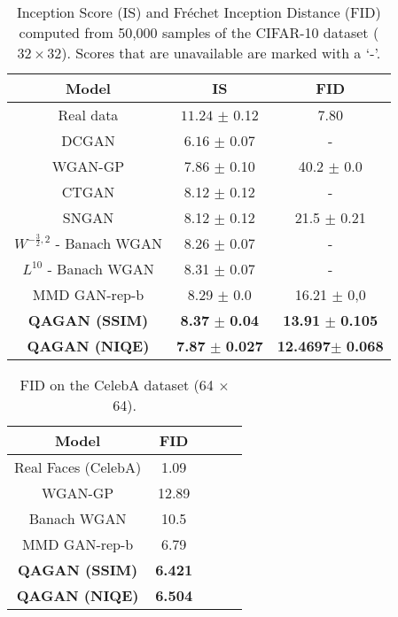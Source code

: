 \documentclass{article}
\begin{document}
\begin{table}[htbp]            
\centering
\caption{Inception Score (IS) and Fr\'echet Inception Distance (FID) computed from 50,000 samples of the CIFAR-10 dataset ($32\times 32$). Scores that are unavailable are marked with a `-'.}
  \begin{tabular}{|c|c|c|}
    \hline
      {\bf{Model}} &
      {\bf{IS}} & {\bf{FID}}\\
      \hline
    Real data & $ 11.24$ $\pm$ 0.12 & 7.80 \\
      \hline
    DCGAN \cite{radford2015unsupervised} & $ 6.16$ $\pm$ 0.07 & -  \\
    \hline
     WGAN-GP \cite{gulrajani2017improved}  & $ 7.86$ $\pm$ 0.10  & 40.2 $\pm$ 0.0 \\
     \hline
     CTGAN \cite{kim2018ct}  &  8.12 $\pm$ 0.12 & -  \\
      \hline
     SNGAN \cite{miyato2018spectral}  &  8.12 $\pm$ 0.12 & 21.5 $\pm$ 0.21  \\
     \hline
    $ W^{-\frac{3}{2},2}$ - Banach WGAN \cite{adler2018banach} & 8.26 $\pm$ 0.07 & - \\
    \hline
     $ L^{10}$ - Banach WGAN \cite{adler2018banach} & 8.31 $\pm $ 0.07 & - \\
   \hline
     MMD GAN-rep-b \cite{li2017mmd} & 8.29 $\pm$ 0.0 & 16.21 $\pm$ 0,0\\
    \hline
     \textbf{QAGAN (SSIM)} & \textbf{8.37} $\pm$ \textbf{0.04} & \textbf{13.91} $\pm$ \textbf{0.105}\\
    \hline
    \textbf{QAGAN (NIQE)} & \textbf{7.87} $\pm$ \textbf{0.027}   & \textbf{12.4697}$\pm $ \textbf{0.068}\\
\hline
    \end{tabular}
    \label{tab:cifar}
\end{table}
\begin{table}[htbp] 
\begin{center}
 \caption{FID on the CelebA dataset (64 $\times$ 64).}
 \label{tab:celeba}
\begin{tabular}{|c|c|c|c|c|}
    \hline
      {\bf{Model}} & {\bf{FID}} \\
      \hline
     Real Faces (CelebA) &  1.09 \\
    \hline
     WGAN-GP \cite{gulrajani2017improved}  & 12.89 \\
     \hline
      Banach WGAN \cite{adler2018banach} & 10.5 \\\hline
   MMD GAN-rep-b \cite{li2017mmd} & 6.79 \\\hline
     \textbf{QAGAN (SSIM)} &   \textbf{6.421} \\\hline
     \textbf{QAGAN (NIQE)} &   \textbf{6.504}\\\hline
     
  \end{tabular}
\end{center}
\end{table}
\end{document}
